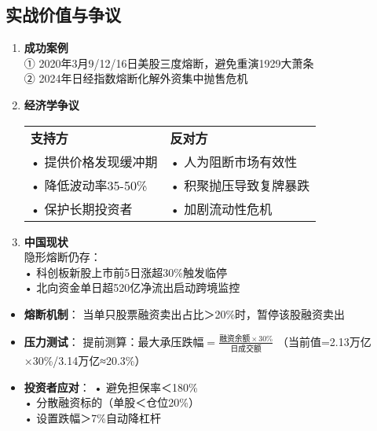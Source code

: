 \subsection{实战价值与争议}
\begin{enumerate}[leftmargin=*, nosep]
    \item \textbf{成功案例}  \\
    ① 2020年3月9/12/16日美股三度熔断，避免重演1929大萧条\\
    ② 2024年日经指数熔断化解外资集中抛售危机
    
    \item \textbf{经济学争议}  \\
    \begin{tabular}{p{5cm}p{5cm}}
        \textbf{支持方} & \textbf{反对方} \\
        • 提供价格发现缓冲期 & • 人为阻断市场有效性 \\
        • 降低波动率35-50\% & • 积聚抛压导致复牌暴跌 \\
        • 保护长期投资者 & • 加剧流动性危机 \\
    \end{tabular}
    
    \item \textbf{中国现状}  \\
    隐形熔断仍存：\\
    • 科创板新股上市前5日涨超30\%触发临停\\
    • 北向资金单日超520亿净流出启动跨境监控
\end{enumerate}

\begin{itemize}[leftmargin=*, nosep]
    \item \textbf{熔断机制}：  
    当单只股票融资卖出占比＞20\%时，暂停该股融资卖出
    
    \item \textbf{压力测试}：  
    提前测算：$ \text{最大承压跌幅} = \frac{\text{融资余额} \times 30\%}{\text{日成交额}} $
    （当前值=2.13万亿×30\%/3.14万亿≈20.3\%）
    
    \item \textbf{投资者应对}：  
    • 避免担保率＜180\% \\
    • 分散融资标的（单股＜仓位20\%）\\
    • 设置跌幅＞7\%自动降杠杆
\end{itemize}

